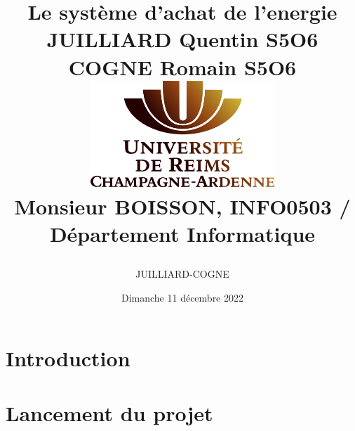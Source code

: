 \documentclass[a4paper, 11pt]{report}
\author{JUILLIARD-COGNE}
\begin{document}
\pagestyle{fancy}

\fancyhead{}\fancyfoot{}

\fancyhead[R]{\thepage} 

\begin{title}

\title{
    {\Huge Le système d'achat de l'energie}\\
    \vspace{1 cm}
    {\LARGE JUILLIARD Quentin S5O6}\\
    {\LARGE COGNE Romain S5O6}\\
    \vspace{2.5 cm}
    {\includegraphics[width=80mm, height=40mm]{logo_univ}}\\
    \vspace{2.5 cm}
    {\Large Monsieur BOISSON, INFO0503 / Département Informatique}\\
    \vspace{1 cm}
    {\date{\Large Dimanche 11 décembre 2022}}}
\end{title}

\maketitle
\tableofcontents
\clearpage


\section{Introduction}


\section{Lancement du projet}

\end{document}
